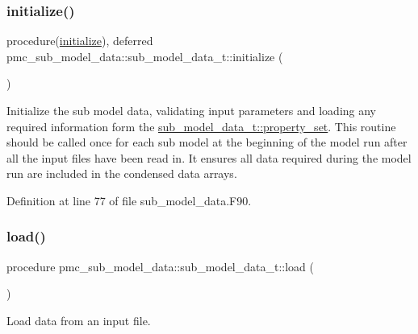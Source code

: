 \subsubsection{\texorpdfstring{initialize()}{initialize()}}
{\footnotesize\ttfamily procedure(\mbox{\hyperlink{interfacepmc__sub__model__data_1_1initialize}{initialize}}), deferred pmc\+\_\+sub\+\_\+model\+\_\+data\+::sub\+\_\+model\+\_\+data\+\_\+t\+::initialize (\begin{DoxyParamCaption}{ }\end{DoxyParamCaption})\hspace{0.3cm}{\ttfamily [private]}}



Initialize the sub model data, validating input parameters and loading any required information form the {\ttfamily \mbox{\hyperlink{structpmc__sub__model__data_1_1sub__model__data__t_aeb00155797966fc95e75ad14d45e7242}{sub\+\_\+model\+\_\+data\+\_\+t\+::property\+\_\+set}}}. This routine should be called once for each sub model at the beginning of the model run after all the input files have been read in. It ensures all data required during the model run are included in the condensed data arrays. 



Definition at line 77 of file sub\+\_\+model\+\_\+data.\+F90.

\mbox{\label{structpmc__sub__model__data_1_1sub__model__data__t_a20b5440b33b4dc9b8f73f6a7befe9e1e}} 
\subsubsection{\texorpdfstring{load()}{load()}}
{\footnotesize\ttfamily procedure pmc\+\_\+sub\+\_\+model\+\_\+data\+::sub\+\_\+model\+\_\+data\+\_\+t\+::load (\begin{DoxyParamCaption}{ }\end{DoxyParamCaption})\hspace{0.3cm}{\ttfamily [private]}}



Load data from an input file. 



